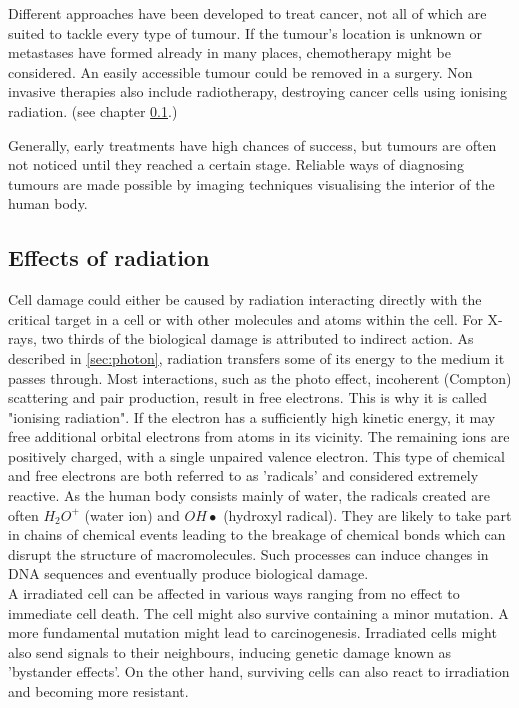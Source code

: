 Different approaches have been developed to treat cancer, not all of which are suited to tackle every type of tumour.
If the tumour's location is unknown or metastases have formed already in many places, chemotherapy might be considered.
An easily accessible tumour could be removed in a surgery.
Non invasive therapies also include radiotherapy, destroying cancer cells using ionising radiation. (see chapter \ref{sec:irradiate}.)

Generally, early treatments have high chances of success, but tumours are often not noticed until they reached a certain stage. 
Reliable ways of diagnosing tumours are made possible by imaging techniques visualising the interior of the human body. \cite{Baumann2017, joiner2009}

\subsection{Effects of radiation}
\label{sec:irradiate}

Cell damage could either be caused by radiation interacting directly with the critical target in a cell or with other molecules and atoms within the cell.
For X-rays, two thirds of the biological damage is attributed to indirect action.
As described in \ref{sec:photon}, radiation transfers some of its energy to the medium it passes through.
Most interactions, such as the photo effect, incoherent (Compton) scattering and pair production, result in free electrons.
This is why it is called "ionising radiation".
If the electron has a sufficiently high kinetic energy, it may free additional orbital electrons from atoms in its vicinity.
The remaining ions are positively charged, with a single unpaired valence electron.
This type of chemical and free electrons are both referred to as 'radicals' and considered extremely reactive.
As the human body consists mainly of water, the radicals created are often $H_2O^+$ (water ion) and $OH \bullet$ (hydroxyl radical).
They are likely to take part in chains of chemical events leading to the breakage of chemical bonds which can disrupt the structure of macromolecules.
Such processes can induce changes in DNA sequences and eventually produce biological damage. \\

A irradiated cell can be affected in various ways ranging from no effect to immediate cell death.
The cell might also survive containing a minor mutation.
A more fundamental mutation might lead to carcinogenesis.
Irradiated cells might also send signals to their neighbours, inducing genetic damage known as 'bystander effects'.
On the other hand, surviving cells can also react to irradiation and becoming more resistant.

